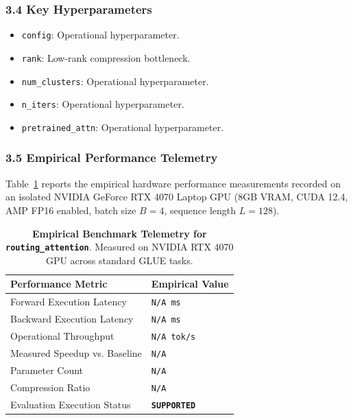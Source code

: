 \subsubsection*{3.4 Key Hyperparameters}
\begin{itemize}
    \item \texttt{config}: Operational hyperparameter.
    \item \texttt{rank}: Low-rank compression bottleneck.
    \item \texttt{num\_clusters}: Operational hyperparameter.
    \item \texttt{n\_iters}: Operational hyperparameter.
    \item \texttt{pretrained\_attn}: Operational hyperparameter.
\end{itemize}

\subsubsection*{3.5 Empirical Performance Telemetry}
Table~\ref{tab:telemetry_routing\_attention} reports the empirical hardware performance measurements recorded on an isolated NVIDIA GeForce RTX 4070 Laptop GPU (8GB VRAM, CUDA 12.4, AMP FP16 enabled, batch size $B=4$, sequence length $L=128$).

\begin{table}[h]
\centering
\small
\caption{\textbf{Empirical Benchmark Telemetry for \texttt{routing\_attention}}. Measured on NVIDIA RTX 4070 GPU across standard GLUE tasks.}
\label{tab:telemetry_routing\_attention}
\begin{tabularx}{\columnwidth}{lX}
\toprule
\textbf{Performance Metric} & \textbf{Empirical Value} \\
\midrule
Forward Execution Latency & \texttt{N/A ms} \\
Backward Execution Latency & \texttt{N/A ms} \\
Operational Throughput & \texttt{N/A tok/s} \\
Measured Speedup vs. Baseline & \texttt{N/A} \\
Parameter Count & \texttt{N/A} \\
Compression Ratio & \texttt{N/A} \\
Evaluation Execution Status & \textbf{\texttt{SUPPORTED}} \\
\bottomrule
\end{tabularx}
\end{table}

